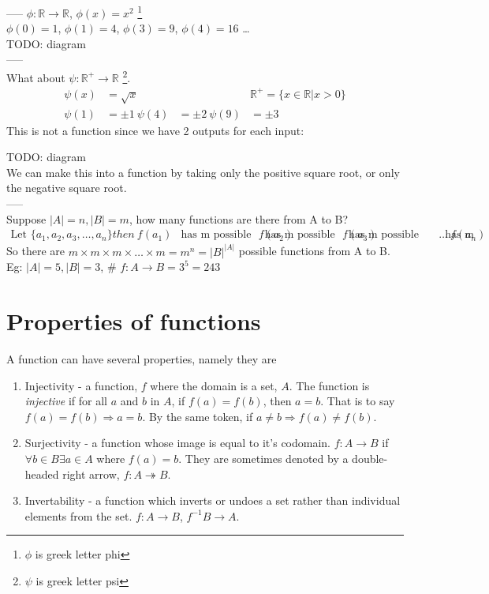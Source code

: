 -----
$\phi : \mathbb{R} \to \mathbb{R}$, $\phi(x) = x^2$ \footnote{$\phi$ is greek letter phi} \\
$\phi(0) = 1$, $\phi(1) = 4$, $\phi(3) = 9$, $\phi(4) = 16$ \ldots \\

TODO: diagram \\
----- \\
What about $\psi: \mathbb{R}^{+} \to \mathbb{R}$ \footnote{$\psi$ is greek letter psi}.
\begin{align}
  \psi(x) & = \sqrt{x} && \mathbb{R}^{+} = \{x \in \mathbb{R} | x > 0 \} \nonumber \\
  \psi(1) & = \pm 1 \
  \psi(4) & = \pm 2 \
  \psi(9) & = \pm 3 \
\end{align}
This is not a function since we have 2 outputs for each input:

TODO: diagram \\
We can make this into a function by taking only the positive square root, or only the negative square root. \\
----- \\
Suppose $|A| = n, |B| = m$, how many functions are there from A to B?
\begin{align}
  \text{Let } \{a_1, a_2, a_3, \ldots , a_n\} then \nonumber \
  f(a_1) & \text{has m possible values} \nonumber \
  f(a_2) & \text{has m possible values} \nonumber \
  f(a_3) & \text{has m possible values} \nonumber \
  \ldots \nonumber \
  f(a_n) & \text{has m possible values} \nonumber \
\end{align}
So there are $m \times m \times m \times \ldots \times m = m^n = |B|^{|A|}$ possible
functions from A to B. \\
Eg: $|A|=5, |B| = 3$,  \# $f: A \to B = 3^5 = 243$

\section{Properties of functions}
\label{sec:PropertiesOfFunctions}
A function can have several properties, namely they are
\begin{enumerate}
  \item Injectivity - a function, $f$ where the domain is a set, $A$. The
  function is \emph{injective} if for all $a$ and $b$ in $A$, if $f(a) = f(b)$,
  then $a = b$. That is to say $f(a) = f(b) \Rightarrow a = b$. By the same
  token, if $a \neq b \Rightarrow f(a) \neq f(b)$.
  
  \item Surjectivity - a function whose image is equal to it's codomain.
  $f: A \to B$ if $\forall b \in B \exists a \in A$ where $f(a) = b$. They are
  sometimes denoted by a double-headed right arrow, $f: A \twoheadrightarrow B$.
  
  \item Invertability - a function which inverts or undoes a set rather than
  individual elements from the set. $f: A \to B$, $f^{-1} B \to A$.
\end{enumerate}

